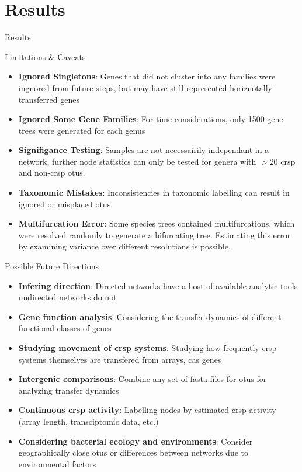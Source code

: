 \documentclass[dvipsnames]{beamer}
\begin{document}
\section{Results}
\begin{frame}{}
    \begin{center}
        \Huge \textcolor{OliveGreen}{Results}
    \end{center}
    \addtocounter{framenumber}{-1}
\end{frame}
\begin{frame}[fragile]{Limitations \& Caveats}
    \begin{itemize}
        \item<2-> \textbf{Ignored Singletons}: Genes that did not cluster into any families were ingnored from future steps, but may have still represented horiznotally transferred genes
        \item<3-> \textbf{Ignored Some Gene Families}: For time considerations, only 1500 gene trees were generated for each genus
        \item<4-> \textbf{Signifigance Testing}: Samples are not necessairily independant in a network, further node statistics can only be tested for genera with $> 20$ \ac{crsp} and non-\ac{crsp} \ac{otu}s.
        \item<5-> \textbf{Taxonomic Mistakes}: Inconsistencies in taxonomic labelling can result in ignored or misplaced \ac{otu}s.
        \item<6-> \textbf{Multifurcation Error}: Some species trees contained multifurcations, which were resolved randomly to generate a bifurcating tree. Estimating this error by examining variance over different resolutions is possible.
    \end{itemize}
\end{frame}
\begin{frame}[fragile]{Possible Future Directions}
    \begin{itemize}
        \item<2-> \textbf{Infering direction}: Directed networks have a host of available analytic tools undirected networks do not
        \item<3-> \textbf{Gene function analysis}: Considering the transfer dynamics of different functional classes of genes
        \item<4-> \textbf{Studying movement of \ac{crsp} systems}: Studying how frequently \ac{crsp} systems themselves are transfered from arrays, cas genes
        \item<5-> \textbf{Intergenic comparisons}: Combine any set of fasta files for \ac{otu}s for analyzing transfer dynamics
        \item<6-> \textbf{Continuous \ac{crsp} activity}: Labelling nodes by estimated \ac{crsp} activity (array length, transciptomic data, etc.)
        \item<7-> \textbf{Considering bacterial ecology and environments}: Consider geographically close \ac{otu}s or differences between networks due to environmental factors
    \end{itemize}
\end{frame}
\end{document}
